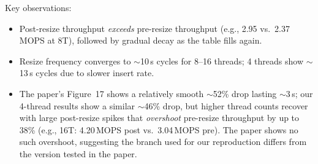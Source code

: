 \documentclass[conference]{IEEEtran}
\begin{document}
\begin{table}[H]
\centering
\caption{RDMA resize: throughput disruption pattern (20M keys, 1MN 1CN, coro=2)}
\label{tab:rdma-resize}
\scriptsize
{}
\end{table}

Key observations:
\begin{itemize}[nosep]
  \item Post-resize throughput \emph{exceeds} pre-resize throughput (e.g., 2.95 vs.\ 2.37\,MOPS at 8T), followed by gradual decay as the table fills again.
  \item Resize frequency converges to $\sim$10\,s cycles for 8--16 threads; 4 threads show $\sim$13\,s cycles due to slower insert rate.
  \item The paper's Figure~17 shows a relatively smooth $\sim$52\% drop lasting $\sim$3\,s; our 4-thread results show a similar $\sim$46\% drop, but higher thread counts recover with large post-resize spikes that \emph{overshoot} pre-resize throughput by up to 38\% (e.g., 16T: 4.20\,MOPS post vs.\ 3.04\,MOPS pre). The paper shows no such overshoot, suggesting the branch used for our reproduction differs from the version tested in the paper.
\end{itemize}
\end{document}
